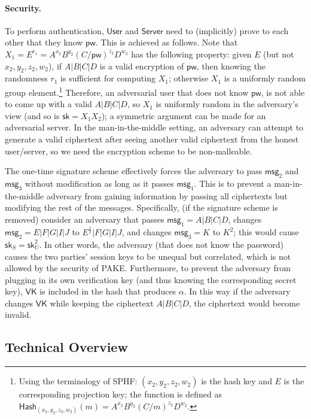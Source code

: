 \documentclass[10pt,a4paper]{article}
\newcommand{\user}{\mathsf{User}}
\newcommand{\sk}{\mathsf{sk}}
\newcommand{\pw}{\mathsf{pw}}
\newcommand{\VK}{\mathsf{VK}}
\newcommand{\server}{\mathsf{Server}}
\newcommand{\msg}[1]{\mathsf{msg}_{#1}}
\begin{document}
\paragraph{Security.}
To perform authentication, $\user$ and $\server$ need to (implicitly) prove to each other that they know $\pw$. This is achieved as follows. Note that $X_1 = E^{r_1} = A^{x_2}B^{y_2}(C/\pw)^{z_2}D^{w_2}$ has the following property: given $E$ (but not $x_2,y_2,z_2,w_2$), if $A|B|C|D$ is a valid encryption of $\pw$, then knowing the randomness $r_1$ is sufficient for computing $X_1$; otherwise $X_1$ is a uniformly random group element.\footnote{Using the terminology of SPHF: $(x_2,y_2,z_2,w_2)$ is the hash key and $E$ is the corresponding projection key; the function is defined as $\mathsf{Hash}_{(x_2,y_2,z_2,w_2)}(m) = A^{x_2}B^{y_2}(C/m)^{z_2}D^{w_2}$.} Therefore, an adversarial user that does not know $\pw$, is not able to come up with a valid $A|B|C|D$, so $X_1$ is uniformly random in the adversary's view (and so is $\sk = X_1X_2$); a symmetric argument can be made for an adversarial server. In the man-in-the-middle setting, an adversary can attempt to generate a valid ciphertext after seeing another valid ciphertext from the honest user/server, so we need the encryption scheme to be non-malleable.

The one-time signature scheme effectively forces the adversary to pass $\msg{2}$ and $\msg{3}$ without modification as long as it passes $\msg{1}$. This is to prevent a man-in-the-middle adversary from gaining information by passing all ciphertexts but modifying the rest of the messages. Specifically, (if the signature scheme is removed) consider an adversary that passes $\msg{1} = A|B|C|D$, changes $\msg{2} = E|F|G|I|J$ to $E^{\frac{1}{2}}|F|G|I|J$, and changes $\msg{3} = K$ to $K^2$; this would cause $\sk_S = \sk_U^2$. In other words, the adversary (that does not know the password) causes the two parties' session keys to be unequal but correlated, which is not allowed by the security of PAKE. Furthermore, to prevent the adversary from plugging in its own verification key (and thus knowing the corresponding secret key), $\VK$ is included in the hash that produces $\alpha$. In this way if the adversary changes $\VK$ while keeping the ciphertext $A|B|C|D$, the ciphertext would become invalid.
	
	\subsection{Technical Overview}
\end{document}
